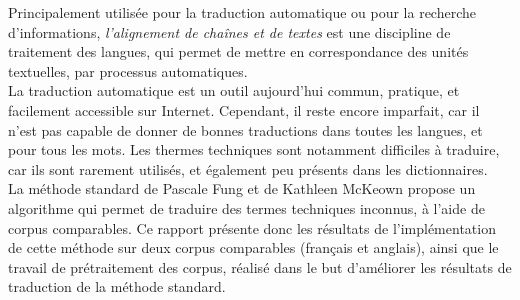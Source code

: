 
Principalement utilisée pour la traduction automatique ou pour la recherche d'informations, \textit{l'alignement de chaînes et de textes} est une discipline de traitement des langues, qui permet de mettre en correspondance des unités textuelles, par processus automatiques.\\

La traduction automatique est un outil aujourd'hui commun, pratique, et facilement accessible sur Internet. Cependant, il reste encore imparfait, car il n'est pas capable de donner de bonnes traductions dans toutes les langues, et pour tous les mots. Les thermes techniques sont notamment difficiles à traduire, car ils sont rarement utilisés, et également peu présents dans les dictionnaires.\\

La méthode standard de Pascale Fung et de Kathleen McKeown\cite{Fung97findingterminology} propose un algorithme qui permet de traduire des termes techniques inconnus, à l'aide de corpus comparables. Ce rapport présente donc les résultats de l'implémentation de cette méthode sur deux corpus comparables (français et anglais), ainsi que le travail de prétraitement des corpus, réalisé dans le but d'améliorer les résultats de traduction de la méthode standard.
